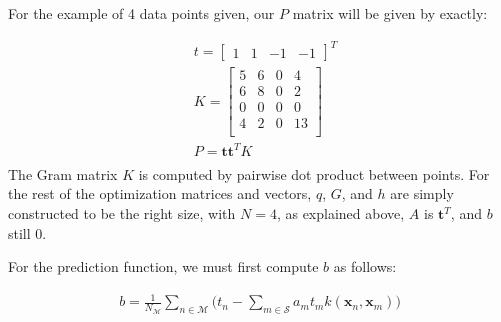 \documentclass[10pt]{article}
\begin{document}
For the example of 4 data points given, our $P$ matrix will be given by exactly:

\begin{equation}
\begin{aligned}
& t = \begin{bmatrix} 1 & 1 & -1 & -1 \end{bmatrix}^T \\
& K = \begin{bmatrix} 
5 & 6 & 0 & 4  \\
6 & 8 & 0 & 2  \\
0 & 0 & 0 & 0  \\
4 & 2 & 0 & 13  \\
\end{bmatrix} \\
& P =  \mathbf{t}\mathbf{t}^T K\\
\end{aligned}
\end{equation}
The Gram matrix $K$ is computed by pairwise dot product between points.  For the rest of the optimization matrices and vectors, $q$, $G$, and $h$ are simply constructed to be the right size, with $N=4$, as explained above, $A$ is $\mathbf{t}^T$, and $b$ still $0$.


For the prediction function, we must first compute $b$ as follows:

\begin{equation}
\begin{aligned}
b = \frac{1}{N_\mathcal{M}} \sum_{n \in \mathcal{M}} \bigg(t_n  - \sum_{m \in \mathcal{S}} a_mt_mk(\mathbf{x}_n, \mathbf{x}_m) \bigg)
\end{aligned}
\end{equation}
\end{document}
